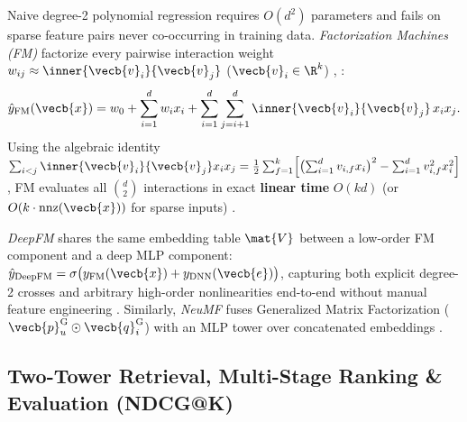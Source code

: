 \documentclass[../../../../master.tex]{subfiles}
\begin{document}
\begin{coremath}
Naive degree-2 polynomial regression requires $O(d^2)$ parameters and fails on sparse feature pairs never co-occurring in training data. \emph{Factorization Machines (FM)} factorize every pairwise interaction weight $w_{ij} \approx \inner{\vecb{v}_i}{\vecb{v}_j}$ ($\vecb{v}_i \in \R^k$) , :
\begin{equation}
  \hat{y}_{\mathrm{FM}}(\vecb{x}) = w_0 + \sum_{i=1}^d w_i x_i + \sum_{i=1}^d \sum_{j=i+1}^d \inner{\vecb{v}_i}{\vecb{v}_j}\, x_i x_j.
\end{equation}
Using the algebraic identity $\sum_{i<j} \inner{\vecb{v}_i}{\vecb{v}_j}x_i x_j = \frac{1}{2}\sum_{f=1}^k \Bigl[\bigl(\sum_{i=1}^d v_{i,f} x_i\bigr)^2 - \sum_{i=1}^d v_{i,f}^2 x_i^2\Bigr]$, FM evaluates all $\binom{d}{2}$ interactions in exact \textbf{linear time} $O(k d)$ (or $O(k \cdot \mathrm{nnz}(\vecb{x}))$ for sparse inputs) .

\emph{DeepFM} shares the same embedding table $\mat{V}$ between a low-order FM component and a deep MLP component: $\hat{y}_{\mathrm{DeepFM}} = \sigma\bigl(y_{\mathrm{FM}}(\vecb{x}) + y_{\mathrm{DNN}}(\vecb{e})\bigr)$, capturing both explicit degree-2 crosses and arbitrary high-order nonlinearities end-to-end without manual feature engineering . Similarly, \emph{NeuMF} fuses Generalized Matrix Factorization ($\vecb{p}_u^{\mathrm{G}}\odot\vecb{q}_i^{\mathrm{G}}$) with an MLP tower over concatenated embeddings .
\end{coremath}

\subsection{Two-Tower Retrieval, Multi-Stage Ranking \& Evaluation (NDCG@K)}
\end{document}
